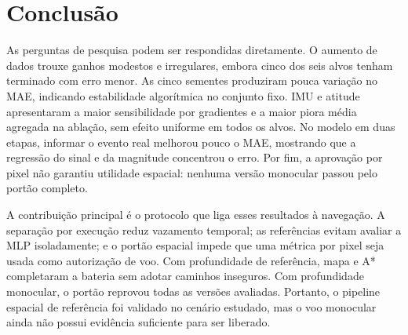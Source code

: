 \documentclass[article,a4paper,12pt,brazil,sumario=tradicional]{abntex2}
\begin{document}
\section{Conclusão}

As perguntas de pesquisa podem ser respondidas diretamente. O aumento de dados trouxe ganhos modestos e irregulares, embora cinco dos seis alvos tenham terminado com erro menor. As cinco sementes produziram pouca variação no MAE, indicando estabilidade algorítmica no conjunto fixo. IMU e atitude apresentaram a maior sensibilidade por gradientes e a maior piora média agregada na ablação, sem efeito uniforme em todos os alvos. No modelo em duas etapas, informar o evento real melhorou pouco o MAE, mostrando que a regressão do sinal e da magnitude concentrou o erro. Por fim, a aprovação por pixel não garantiu utilidade espacial: nenhuma versão monocular passou pelo portão completo.

\begin{table}[htb]
\centering
\caption{Relação entre perguntas, experimentos e respostas.}
\label{tab:artigo-perguntas}
\end{table}

A contribuição principal é o protocolo que liga esses resultados à navegação. A separação por execução reduz vazamento temporal; as referências evitam avaliar a MLP isoladamente; e o portão espacial impede que uma métrica por pixel seja usada como autorização de voo. Com profundidade de referência, mapa e A* completaram a bateria sem adotar caminhos inseguros. Com profundidade monocular, o portão reprovou todas as versões avaliadas. Portanto, o pipeline espacial de referência foi validado no cenário estudado, mas o voo monocular ainda não possui evidência suficiente para ser liberado.
\end{document}
